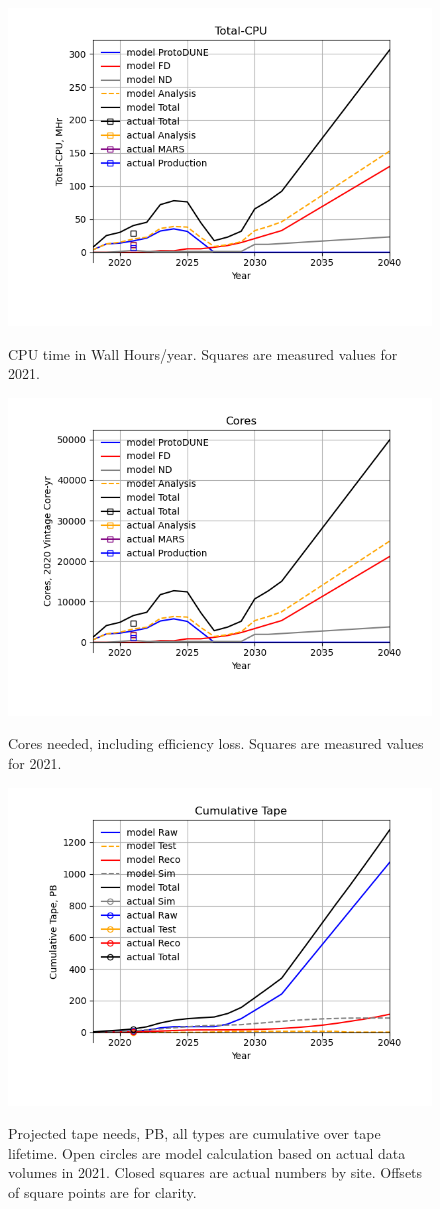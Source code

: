 \documentclass[12pt]{article}
\begin{document}
\pagebreak\begin{figure}[h]
\centering\includegraphics[height=0.4\textwidth]{Parameters_2022-07-10-2040-Total-CPU.png}\label{TotalCPU}
\caption{CPU time in Wall Hours/year. Squares are measured values for 2021.}
\end{figure}
\begin{figure}[h]
\centering\includegraphics[height=0.4\textwidth]{Parameters_2022-07-10-2040-Cores.png}\label{Cores}
\caption{Cores needed, including efficiency loss. Squares are measured values for 2021.}
\end{figure}
\begin{figure}[h]
\centering\includegraphics[height=0.4\textwidth]{Parameters_2022-07-10-2040-Cumulative-Tape.png}\label{CumulativeTape}
\caption{Projected  tape needs, PB, all types are cumulative over tape lifetime. Open circles are model calculation based on actual data volumes in 2021. Closed squares are actual numbers by site. Offsets of square points are for clarity.}
\end{figure}
\end{document}
